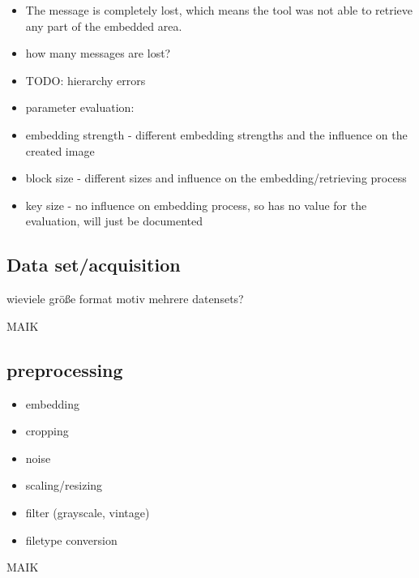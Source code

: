 \begin{itemize}
    \item The message is completely lost, which means the tool was not able to retrieve any part of the embedded area. 
    \item how many messages are lost?
    \item TODO: hierarchy errors
    \item parameter evaluation: 
    \item embedding strength - different embedding strengths and the influence on the created image
    \item block size - different sizes and influence on the embedding/retrieving process
    \item key size - no influence on embedding process, so has no value for the evaluation, will just be documented
\end{itemize}



\subsection{Data set/acquisition} 
wieviele
größe
format
motiv
mehrere datensets?

MAIK

\subsection{preprocessing} 
\begin{itemize}
    \item embedding
    \item cropping
    \item noise
    \item scaling/resizing
    \item filter (grayscale, vintage)
    \item filetype conversion
\end{itemize}

MAIK

